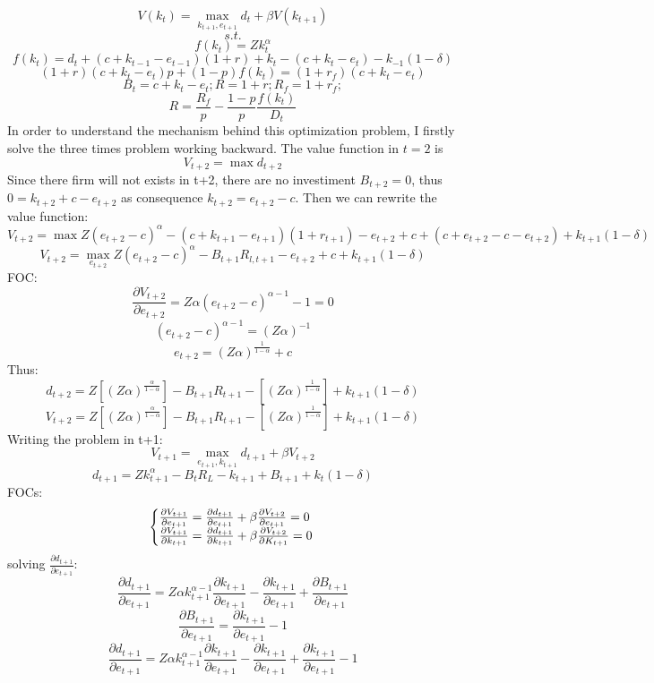 \documentclass[12pt]{article}
\begin{document}
\[V(k_{t}) = \max_{k_{t+1}, e_{t+1}} d_t + \beta V(k_{t+1})\]
\[s.t.\]
\[f(k_t) = Z k_t^\alpha\]
\[f(k_t) = d_t + (c+k_{t-1}-e_{t-1})(1+r) + k_{t} - (c + k_{t}- e_{t}) - k_{-1}(1-\delta)\]
\[(1+r)(c+k_t -e_t)p + (1-p)f(k_t) = (1+r_f)(c+k_t -e_t) \]
\[B_t = c+k_t-e_t; R= 1+r; R_f= 1 + r_f;  \]
\[R=\frac{R_f}{p}  -\frac{ 1-p }{ p }\frac{f(k_t)}{D_t}\]
In order to understand the mechanism behind this optimization problem, I firstly solve the three times problem working
backward.
The value function in \(t=2\) is 
\[ V_{t+2} =  \max d_{t+2}\]
Since there firm will not exists in t+2, there are no investiment \(B_{t+2}=0\), thus \(0=k_{t+2}+c-e_{t+2}\) as
consequence \(k_{t+2} = e_{t+2} - c\). Then we can rewrite the value function:
\[ V_{t+2} = \max Z(e_{t+2} - c)^\alpha - (c+k_{t+1}-e_{t+1})(1+r_{t+1}) - e_{t+2} + c + (c + e_{t+2} - c - e_{t+2}) +
k_{t+1}(1-\delta) \]
\[V_{t+2} = \max_{e_{t+2}} Z(e_{t+2} - c)^\alpha - B_{t+1}R_{l,t+1} - e_{t+2} + c + k_{t+1}(1-\delta) \]
FOC:
\[\frac{\partial V_{t+2}}{\partial e_{t+2}} = Z \alpha (e_{t+2} - c)^{\alpha-1} - 1 = 0\]
\[ (e_{t+2} - c)^{\alpha-1}= (Z \alpha)^{-1}\]
\[ e_{t+2} = (Z \alpha)^{\frac{1}{1-\alpha}}+c\]
Thus:
\[d_{t+2} = Z\left[(Z \alpha)^{\frac{\alpha}{1-\alpha}}\right]  - B_{t+1}R_{t+1} -  \left[(Z
\alpha)^{\frac{1}{1-\alpha}}\right] + k_{t+1}(1-\delta) \]
\[V_{t+2} = Z\left[(Z \alpha)^{\frac{\alpha}{1-\alpha}}\right]  - B_{t+1}R_{t+1} -  \left[(Z
\alpha)^{\frac{1}{1-\alpha}}\right] + k_{t+1}(1-\delta) \]
Writing the problem in t+1:
\[V_{t+1} = \max_{e_{t+1},k_{t+1}} d_{t+1} + \beta V_{t+2}\]
\[d_{t+1} = Zk^\alpha_{t+1} - B_t R_L - k_{t+1} + B_{t+1} + k_t(1-\delta)\]
FOCs:
\begin{equation}
    \left\{\begin{array}{@{}l@{}}
        \frac{\partial V_{t+1}}{\partial e_{t+1}} = \frac{\partial d_{t+1}}{\partial e_{t+1}} + \beta \frac{\partial
            V_{t+2}}{\partial e_{t+1}} = 0  \\
        \frac{\partial V_{t+1}}{\partial k_{t+1}} = \frac{\partial d_{t+1}}{\partial k_{t+1}} + \beta \frac{\partial
            V_{t+2}}{\partial K_{t+1}} = 0 \\
    \end{array} \right .\,
\end{equation}
solving \(\frac{\partial d_{t+1}}{\partial e_{t+1}}\):
\[\frac{\partial d_{t+1}}{\partial e_{t+1}} = Z \alpha k_{t+1} ^{\alpha-1}\frac{\partial k_{t+1}}{\partial e_{t+1}}
 - \frac{\partial k_{t+1}}{\partial e_{t+1}} + \frac{\partial B_{t+1}}{\partial e_{t+1}}\]
\[\frac{\partial B_{t+1}}{\partial e_{t+1}} = \frac{\partial k_{t+1}}{\partial e_{t+1}} - 1\]
\[\frac{\partial d_{t+1}}{\partial e_{t+1}} = Z \alpha k_{t+1} ^{\alpha-1}\frac{\partial k_{t+1}}{\partial e_{t+1}} -
\frac{\partial k_{t+1}}{\partial e_{t+1}} + \frac{\partial k_{t+1}}{\partial e_{t+1}} - 1\]
\end{document}
